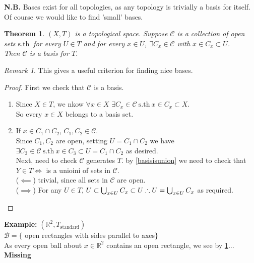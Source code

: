 \documentclass{article}
\newcommand{\sth}{\mathrm{s.th}\ }
\newcommand{\R}{\mathbb{R}}
\renewcommand{\c}{\mathcal{C}}
\newcommand{\ba}{\mathcal{B}}
\newtheorem{stheorem}{Theorem}[theorem]
\theoremstyle{remark}
\theoremstyle{example}
\theoremstyle{examples}
\newtheorem*{remark}{Remark}
\begin{document}
	\textbf{N.B.} Bases exist for all topologies, as any topology is trivially a basis for itself. Of course we would like to find 'small' bases.
	
	\begin{stheorem}
		\label{collectionisbasisfortopology}
		$(X,T)$ is a topological space. Suppose $\c$ is a collection of open sets $\sth$ for every $U \in T$ and for every $x \in U$, $\exists C_x \in \c$ with $x \in C_x \subset U$.\\
		Then $\c$ is a basis for $T$.
	\end{stheorem}

	\begin{remark}
		This gives a useful criterion for finding nice bases.
	\end{remark}

	\begin{proof}
		First we check that $\c$ is a basis.
		\begin{enumerate}
			\item Since $X \in T$, we nkow $\forall x \in X$ $\exists C_x \in \c\ \sth x \in C_x \subset X$.\\
			So every $x \in X$ belongs to a basis set.
			\item If $x \in C_1 \cap C_2$, $C_1,C_2 \in \c$.\\
			Since $C_1, C_2$ are open, setting $U = C_1 \cap C_2$ we have $\exists C_3 \in \c\ \sth x \in C_3 \subset U=C_1 \cap C_2$ as desired.\\
			Next, need to check $\c$ generates $T$. by \ref{basisisunion} we need to check that $Y \in T \iff $ is a unioini of sets in $\c$.\\
			($\impliedby$) trivial, since all sets in $\c$ are open.\\
			($\implies$) For any $U \in T$, $U \subset \bigcup_{x \in U} C_x \subset U\\
			\therefore U = \bigcup_{x \in U} C_x$ as required.
		\end{enumerate}
	\end{proof}
	
	\textbf{Example:} $(\R^2,T_\mathrm{standard})$\\
	$\ba = \{$ open rectangles with sides parallel to axes$\}$\\
	As every open ball about $x \in \R^2$ contains an open rectangle, we see by \ref{collectionisbasisfortopology}... \textbf{Missing}
	
\end{document}
